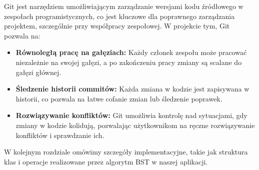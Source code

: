 Git jest narzędziem umożliwiającym zarządzanie wersjami kodu źródłowego w zespołach programistycznych, co jest kluczowe dla poprawnego zarządzania projektem, szczególnie przy współpracy zespołowej. W projekcie tym, Git pozwala na:
\begin{itemize}
	\item \textbf{Równoległą pracę na gałęziach:} Każdy członek zespołu może pracować niezależnie na swojej gałęzi, a po zakończeniu pracy zmiany są scalane do gałęzi głównej.
	\item \textbf{Śledzenie historii commitów:} Każda zmiana w kodzie jest zapisywana w historii, co pozwala na łatwe cofanie zmian lub śledzenie poprawek.
	\item \textbf{Rozwiązywanie konfliktów:} Git umożliwia kontrolę nad sytuacjami, gdy zmiany w kodzie kolidują, pozwalając użytkownikom na ręczne rozwiązywanie konfliktów i sprawdzanie ich.
\end{itemize}

W kolejnym rozdziale omówimy szczegóły implementacyjne, takie jak struktura klas i operacje realizowane przez algorytm BST w naszej aplikacji.
